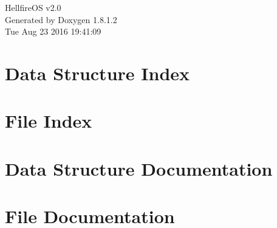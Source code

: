 \documentclass{book}
\begin{document}
\hypersetup{pageanchor=false,citecolor=blue}
\begin{titlepage}
\vspace*{7cm}
\begin{center}
{\Large Hellfire\-O\-S v2.0 }\\
\vspace*{1cm}
{\large Generated by Doxygen 1.8.1.2}\\
\vspace*{0.5cm}
{\small Tue Aug 23 2016 19:41:09}\\
\end{center}
\end{titlepage}
\clearemptydoublepage
{}
\tableofcontents
\clearemptydoublepage
{}
\hypersetup{pageanchor=true,citecolor=blue}
\chapter{Data Structure Index}

\chapter{File Index}

\chapter{Data Structure Documentation}












\chapter{File Documentation}






























\printindex
\end{document}
